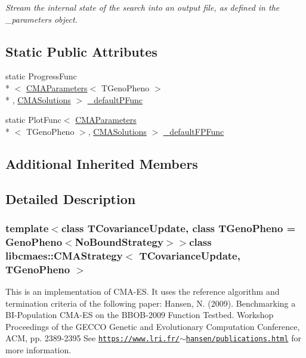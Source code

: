 \begin{DoxyCompactItemize}
\begin{DoxyCompactList}\small\item\em Stream the internal state of the search into an output file, as defined in the \-\_\-parameters object. \end{DoxyCompactList}\end{DoxyCompactItemize}
\subsection*{Static Public Attributes}
\begin{DoxyCompactItemize}
\item 
static Progress\-Func\\*
$<$ \hyperlink{classlibcmaes_1_1CMAParameters}{C\-M\-A\-Parameters}$<$ T\-Geno\-Pheno $>$\\*
, \hyperlink{classlibcmaes_1_1CMASolutions}{C\-M\-A\-Solutions} $>$ \hyperlink{classlibcmaes_1_1CMAStrategy_af6d980c670eef47ee810645739999d5b}{\-\_\-default\-P\-Func}
\item 
static Plot\-Func$<$ \hyperlink{classlibcmaes_1_1CMAParameters}{C\-M\-A\-Parameters}\\*
$<$ T\-Geno\-Pheno $>$, \hyperlink{classlibcmaes_1_1CMASolutions}{C\-M\-A\-Solutions} $>$ \hyperlink{classlibcmaes_1_1CMAStrategy_a0fcdccd9451a2dc509ee651f664ac31f}{\-\_\-default\-F\-P\-Func}
\end{DoxyCompactItemize}
\subsection*{Additional Inherited Members}


\subsection{Detailed Description}
\subsubsection*{template$<$class T\-Covariance\-Update, class T\-Geno\-Pheno = Geno\-Pheno$<$\-No\-Bound\-Strategy$>$$>$class libcmaes\-::\-C\-M\-A\-Strategy$<$ T\-Covariance\-Update, T\-Geno\-Pheno $>$}

This is an implementation of C\-M\-A-\/\-E\-S. It uses the reference algorithm and termination criteria of the following paper\-: Hansen, N. (2009). Benchmarking a B\-I-\/\-Population C\-M\-A-\/\-E\-S on the B\-B\-O\-B-\/2009 Function Testbed. Workshop Proceedings of the G\-E\-C\-C\-O Genetic and Evolutionary Computation Conference, A\-C\-M, pp. 2389-\/2395 See \href{https://www.lri.fr/~hansen/publications.html}{\tt https\-://www.\-lri.\-fr/$\sim$hansen/publications.\-html} for more information. 

